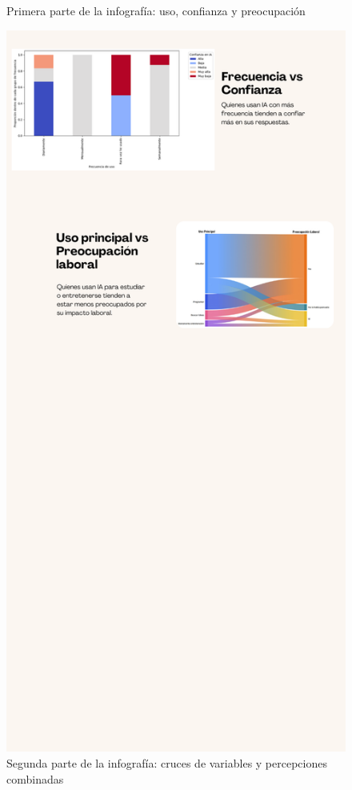\documentclass[12pt, a4paper]{article}
\begin{document}
\begin{figure}[H]
\begin{minipage}[t]{0.45\linewidth}
        \caption{Primera parte de la infografía: uso, confianza y preocupación}
    \end{minipage}
    \hfill
    \begin{minipage}[t]{0.45\linewidth}
        \centering
        \includegraphics[width=\linewidth]{Graficos/2.png}
        \caption{Segunda parte de la infografía: cruces de variables y percepciones combinadas}
    \end{minipage}
\end{figure}
\end{document}

